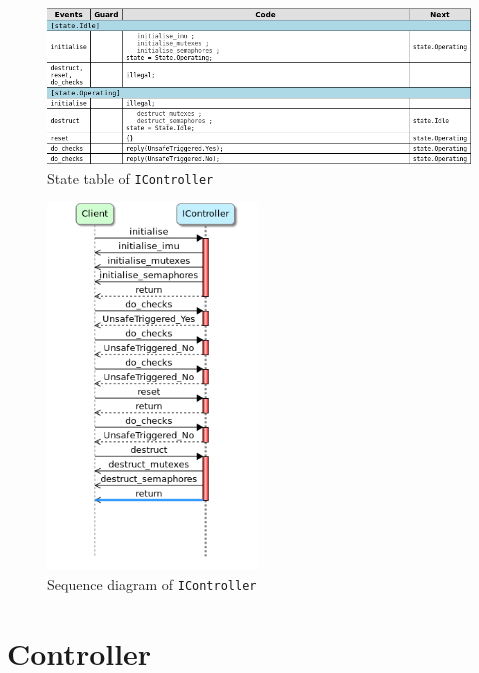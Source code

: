 \documentclass[12pt]{scrreprt}
\begin{document}
\begin{appendices}
\begin{figure}[H]
    \centering
    \includegraphics[width=\textwidth]{Figures/results/modelling_figures/IController/IController_state_table.png}
    \caption{State table of \texttt{IController}}
    \label{fig:IController_state_table}
\end{figure}

\begin{figure}[H]
    \centering
    \includegraphics[width=0.5\textwidth]{Figures/results/modelling_figures/IController/IController_seq.png}
    \caption{Sequence diagram of \texttt{IController}}
    \label{fig:IController_seq}
\end{figure}

\section{Controller}
\label{aController}


\end{appendices}
\end{document}
